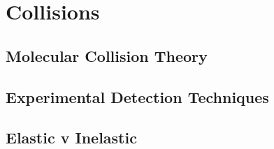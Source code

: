 \chapter{Collisions}
\label{chapter:collisions}

\section{Molecular Collision Theory}

\section{Experimental Detection Techniques}

\section{Elastic v Inelastic}